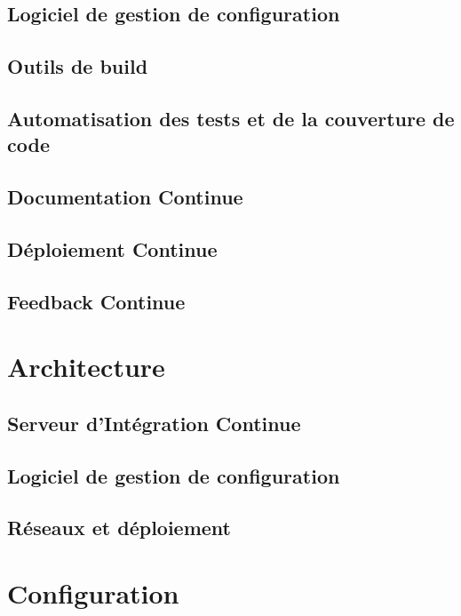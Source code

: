 \documentclass{report}
\begin{document}
        \subsection{Logiciel de gestion de configuration}

        \subsection{Outils de build}

        \subsection{Automatisation des tests et de la couverture de code}

        \subsection{Documentation Continue}

        \subsection{Déploiement Continue}

        \subsection{Feedback Continue}

      \section{Architecture}

        \subsection{Serveur d’Intégration Continue}

        \subsection{Logiciel de gestion de configuration}

        \subsection{Réseaux et déploiement}

      \section{Configuration}
\end{document}
